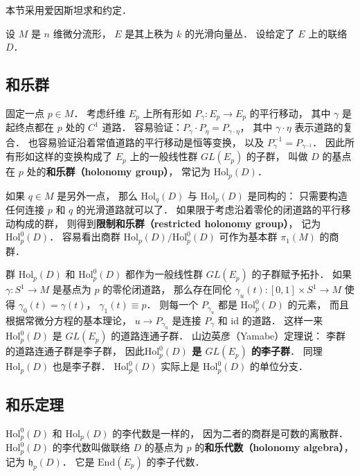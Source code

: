 

本节采用爱因斯坦求和约定．

设 $M$ 是 $n$ 维微分流形， $E$ 是其上秩为 $k$ 的光滑向量丛． 设给定了 $E$ 上的联络 $D$．

\subsection{和乐群}
固定一点 $p\in M$． 考虑纤维 $E_p$ 上所有形如 $P_\gamma:E_p\to E_p$ 的平行移动， 其中 $\gamma$ 是起终点都在 $p$ 处的 $C^1$ 道路． 容易验证：$P_\gamma\cdot P_\eta=P_{\gamma\cdot\eta}$，
其中 $\gamma\cdot\eta$ 表示道路的复合． 也容易验证沿着常值道路的平行移动是恒等变换， 以及 $P_\gamma^{-1}=P_{\gamma^{-1}}$． 因此所有形如这样的变换构成了 $E_p$ 上的一般线性群 $GL(E_p)$ 的子群， 叫做 $D$ 的基点在 $p$ 处的\textbf{和乐群（holonomy group）}， 常记为 $\text{Hol}_p(D)$． 

如果 $q\in M$ 是另外一点， 那么 $\text{Hol}_q(D)$ 与 $\text{Hol}_p(D)$ 是同构的： 只需要构造任何连接 $p$ 和 $q$ 的光滑道路就可以了． 如果限于考虑沿着零伦的闭道路的平行移动构成的群， 则得到\textbf{限制和乐群（restricted holonomy group）}， 记为 $\text{Hol}^0_p(D)$． 容易看出商群 $\text{Hol}_p(D)/\text{Hol}_p^0(D)$ 可作为基本群 $\pi_1(M)$ 的商群．

群 $\text{Hol}_p(D)$ 和 $\text{Hol}_p^0(D)$ 都作为一般线性群 $GL(E_p)$ 的子群赋予拓扑． 如果 $\gamma:S^1\to M$ 是基点为 $p$ 的零伦闭道路， 那么存在同伦 $\gamma_u(t):[0,1]\times S^1\to M$ 使得 $\gamma_0(t)=\gamma(t)$， $\gamma_1(t)\equiv p$． 则每一个 $P_{\gamma_u}$ 都是 $\text{Hol}_p^0(D)$ 的元素， 而且根据常微分方程的基本理论， $u\to P_{\gamma_u}$ 是连接 $P_\gamma$ 和 $\text{id}$ 的道路． 这样一来 $\text{Hol}_p^0(D)$ 是 $GL(E_p)$ 的道路连通子群． 山边英彦（Yamabe）定理说： 李群的道路连通子群是李子群， 因此\textbf{$\text{Hol}_p^0(D)$ 是 $GL(E_p)$ 的李子群}． 同理 $\text{Hol}_p(D)$ 也是李子群． $\text{Hol}_p^0(D)$ 实际上是 $\text{Hol}_p^0(D)$ 的单位分支．

\subsection{和乐定理}
$\text{Hol}_p^0(D)$ 和 $\text{Hol}_p(D)$ 的李代数是一样的， 因为二者的商群是可数的离散群． $\text{Hol}_p^0(D)$ 的李代数叫做联络 $D$ 的基点为 $p$ 的\textbf{和乐代数（holonomy algebra）}， 记为 $\mathfrak{h}_p(D)$．  它是 $\text{End}(E_p)$ 的李子代数． 

